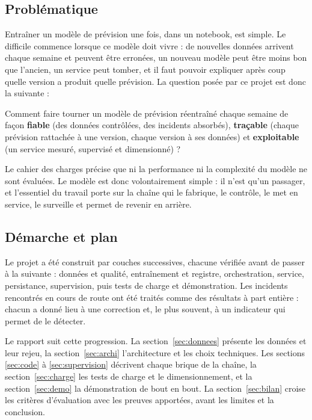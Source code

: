 \documentclass[11pt,a4paper]{article}
\begin{document}
\subsection{Problématique}

Entraîner un modèle de prévision une fois, dans un notebook, est simple. Le difficile
commence lorsque ce modèle doit vivre : de nouvelles données arrivent chaque semaine et
peuvent être erronées, un nouveau modèle peut être moins bon que l'ancien, un service peut
tomber, et il faut pouvoir expliquer après coup quelle version a produit quelle prévision.
La question posée par ce projet est donc la suivante :

\begin{encadre}[title=Problématique]
Comment faire tourner un modèle de prévision réentraîné chaque semaine de façon
\textbf{fiable} (des données contrôlées, des incidents absorbés), \textbf{traçable} (chaque
prévision rattachée à une version, chaque version à ses données) et
\textbf{exploitable} (un service mesuré, supervisé et dimensionné) ?
\end{encadre}

Le cahier des charges précise que ni la performance ni la complexité du modèle ne sont
évaluées. Le modèle est donc volontairement simple : il n'est qu'un passager, et l'essentiel
du travail porte sur la chaîne qui le fabrique, le contrôle, le met en service, le surveille
et permet de revenir en arrière.

\subsection{Démarche et plan}

Le projet a été construit par couches successives, chacune vérifiée avant de passer à la
suivante : données et qualité, entraînement et registre, orchestration, service,
persistance, supervision, puis tests de charge et démonstration. Les incidents rencontrés
en cours de route ont été traités comme des résultats à part entière : chacun a donné lieu à
une correction et, le plus souvent, à un indicateur qui permet de le détecter.

Le rapport suit cette progression. La section~\ref{sec:donnees} présente les données et leur
rejeu, la section~\ref{sec:archi} l'architecture et les choix techniques. Les sections
\ref{sec:code} à \ref{sec:supervision} décrivent chaque brique de la chaîne, la
section~\ref{sec:charge} les tests de charge et le dimensionnement, et la
section~\ref{sec:demo} la démonstration de bout en bout. La section~\ref{sec:bilan} croise
les critères d'évaluation avec les preuves apportées, avant les limites et la conclusion.
\end{document}
